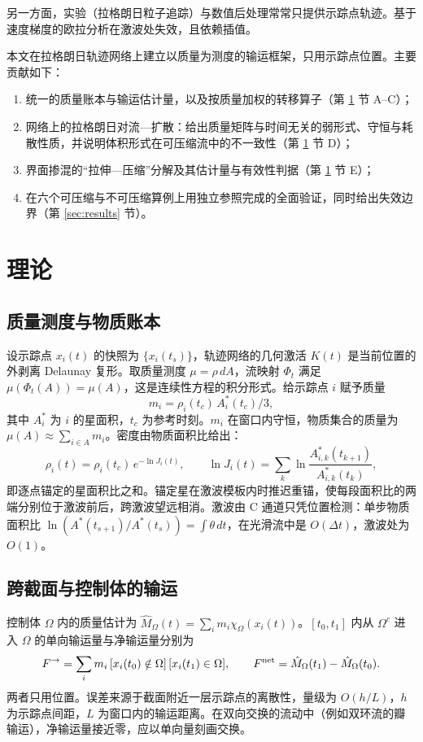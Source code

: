 \documentclass[10.5pt,a4paper]{article}
\begin{document}
另一方面，实验（拉格朗日粒子追踪）与数值后处理常常只提供示踪点轨迹。基于速度梯度的欧拉分析在激波处失效，且依赖插值。

本文在拉格朗日轨迹网络上建立以质量为测度的输运框架，只用示踪点位置。主要贡献如下：
\begin{enumerate}
\item 统一的质量账本与输运估计量，以及按质量加权的转移算子（第 \ref{sec:theory} 节 A–C）；
\item 网络上的拉格朗日对流—扩散：给出质量矩阵与时间无关的弱形式、守恒与耗散性质，并说明体积形式在可压缩流中的不一致性（第 \ref{sec:theory} 节 D）；
\item 界面掺混的“拉伸—压缩”分解及其估计量与有效性判据（第 \ref{sec:theory} 节 E）；
\item 在六个可压缩与不可压缩算例上用独立参照完成的全面验证，同时给出失效边界（第 \ref{sec:results} 节）。
\end{enumerate}

\section{理论}\label{sec:theory}

\subsection{质量测度与物质账本}
设示踪点 $x_i(t)$ 的快照为 $\{x_i(t_s)\}$，轨迹网络的几何激活 $K(t)$ 是当前位置的外剥离 Delaunay 复形。取质量测度 $\mu=\rho\,dA$，流映射 $\Phi_t$ 满足 $\mu(\Phi_t(A))=\mu(A)$，这是连续性方程的积分形式。给示踪点 $i$ 赋予质量
\begin{equation}
m_i=\rho_i(t_c)\,A^*_i(t_c)/3 ,\label{eq:mass}
\end{equation}
其中 $A^*_i$ 为 $i$ 的星面积，$t_c$ 为参考时刻。$m_i$ 在窗口内守恒，物质集合的质量为 $\mu(A)\approx\sum_{i\in A}m_i$。密度由物质面积比给出：
\begin{equation}
\rho_i(t)=\rho_i(t_c)\,e^{-\ln J_i(t)},\qquad \ln J_i(t)=\sum_k\ln\frac{A^*_{i,k}(t_{k+1})}{A^*_{i,k}(t_k)} ,
\end{equation}
即逐点锚定的星面积比之和。锚定星在激波模板内时推迟重锚，使每段面积比的两端分别位于激波前后，跨激波望远相消。激波由 C 通道只凭位置检测：单步物质面积比 $\ln(A^*(t_{s+1})/A^*(t_s))=\int\theta\,dt$，在光滑流中是 $O(\Delta t)$，激波处为 $O(1)$。

\subsection{跨截面与控制体的输运}
控制体 $\Omega$ 内的质量估计为 $\hat M_\Omega(t)=\sum_im_i\chi_\Omega(x_i(t))$。$[t_0,t_1]$ 内从 $\Omega^c$ 进入 $\Omega$ 的单向输运量与净输运量分别为
\begin{equation}
F^{\to}=\sum_im_i\,[x_i(t_0)\notin\Omega]\,[x_i(t_1)\in\Omega],\qquad
F^{\rm net}=\hat M_\Omega(t_1)-\hat M_\Omega(t_0).
\end{equation}
两者只用位置。误差来源于截面附近一层示踪点的离散性，量级为 $O(h/L)$，$h$ 为示踪点间距，$L$ 为窗口内的输运距离。在双向交换的流动中（例如双环流的瓣输运），净输运量接近零，应以单向量刻画交换。
\end{document}
